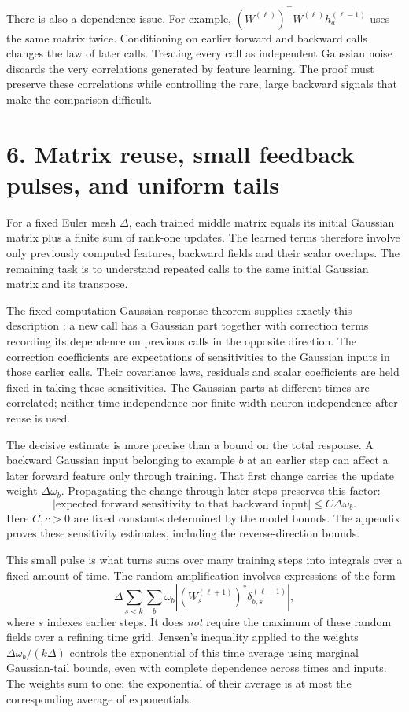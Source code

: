There is also a dependence issue. For example,
$(W^{(\ell)})^\top W^{(\ell)}h_a^{(\ell-1)}$ uses the same matrix twice.
Conditioning on earlier forward and backward calls changes the law of later
calls. Treating every call as independent Gaussian noise discards the very
correlations generated by feature learning. The proof must preserve these
correlations while controlling the rare, large backward signals that make
the comparison difficult.

\newpage
\section*{6. Matrix reuse, small feedback pulses, and uniform tails}

For a fixed Euler mesh $\Delta$, each trained middle matrix equals its initial
Gaussian matrix plus a finite sum of rank-one updates. The learned terms
therefore involve only previously computed features, backward fields and
their scalar overlaps. The remaining task is to understand repeated calls
to the same initial Gaussian matrix and its transpose.

The fixed-computation Gaussian response theorem supplies exactly this
description \cite{TP3}: a new call has a Gaussian part together with
correction terms recording its dependence on previous calls in the opposite
direction. The correction coefficients are expectations of sensitivities
to the Gaussian inputs in those earlier calls. Their covariance laws,
residuals and scalar coefficients are held fixed in taking these
sensitivities. The Gaussian parts at different times are correlated; neither
time independence nor finite-width neuron independence after reuse is used.

The decisive estimate is more precise than a bound on the total response.
A backward Gaussian input belonging to example $b$ at an earlier step can
affect a later forward feature only through training. That first change
carries the update weight $\Delta\omega_b$. Propagating the change through
later steps preserves this factor:
\[
\bigl|\text{expected forward sensitivity to that backward input}\bigr|
\le C\Delta\omega_b.
\]
Here $C,c>0$ are fixed constants determined by the model bounds. The appendix
proves these sensitivity estimates, including the reverse-direction bounds.

This small pulse is what turns sums over many training steps into integrals
over a fixed amount of time. The random amplification involves expressions
of the form
\[
\Delta\sum_{s<k}\sum_b\omega_b
\left|(W_s^{(\ell+1)})^*\delta_{b,s}^{(\ell+1)}\right|,
\]
where $s$ indexes earlier steps. It does \emph{not} require the maximum of
these random fields over a refining time grid. Jensen's inequality applied
to the weights $\Delta\omega_b/(k\Delta)$ controls the exponential of this
time average using marginal Gaussian-tail bounds, even with complete
dependence across times and inputs. The weights sum to one: the exponential
of their average is at most the corresponding average of exponentials.

